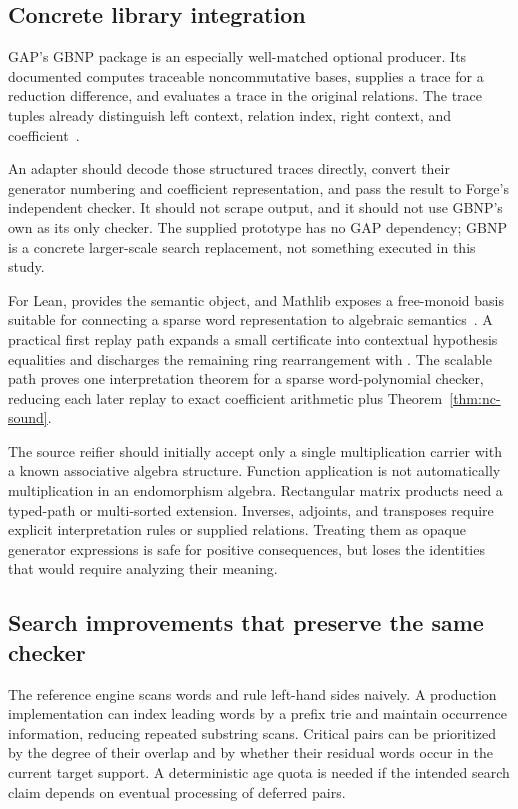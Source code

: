 \subsection{Concrete library integration}
GAP's GBNP package is an especially well-matched optional producer. Its documented  computes traceable noncommutative bases,  supplies a trace for a reduction difference, and  evaluates a trace in the original relations. The trace tuples already distinguish left context, relation index, right context, and coefficient~\cite{gbnp}.

An adapter should decode those structured traces directly, convert their generator numbering and coefficient representation, and pass the result to Forge's independent checker. It should not scrape  output, and it should not use GBNP's own  as its only checker. The supplied prototype has no GAP dependency; GBNP is a concrete larger-scale search replacement, not something executed in this study.

For Lean,  provides the semantic object, and Mathlib exposes a free-monoid basis suitable for connecting a sparse word representation to algebraic semantics~\cite{free-algebra}. A practical first replay path expands a small certificate into contextual hypothesis equalities and discharges the remaining ring rearrangement with . The scalable path proves one interpretation theorem for a sparse word-polynomial checker, reducing each later replay to exact coefficient arithmetic plus Theorem~\ref{thm:nc-sound}.

The source reifier should initially accept only a single multiplication carrier with a known associative algebra structure. Function application is not automatically multiplication in an endomorphism algebra. Rectangular matrix products need a typed-path or multi-sorted extension. Inverses, adjoints, and transposes require explicit interpretation rules or supplied relations. Treating them as opaque generator expressions is safe for positive consequences, but loses the identities that would require analyzing their meaning.

\subsection{Search improvements that preserve the same checker}
The reference engine scans words and rule left-hand sides naively. A production implementation can index leading words by a prefix trie and maintain occurrence information, reducing repeated substring scans. Critical pairs can be prioritized by the degree of their overlap and by whether their residual words occur in the current target support. A deterministic age quota is needed if the intended search claim depends on eventual processing of deferred pairs.

